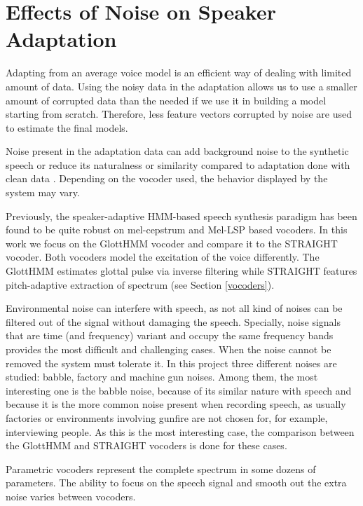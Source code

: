 \section{Effects of Noise on Speaker Adaptation}
\label{noise_speaker_adaptation}
Adapting from an average voice model is an efficient way of dealing with limited amount of data.
%
Using the noisy data in the adaptation allows us to use a smaller amount of corrupted data than the needed if we use it in building a model starting from scratch.
%
Therefore, less feature vectors corrupted by noise are used to estimate the final models.

Noise present in the adaptation data can add background noise to the synthetic speech or reduce its naturalness or similarity compared to adaptation done with clean data \cite{karhila_jstsp_14}.
%
Depending on the vocoder used, the behavior displayed by the system may vary.

Previously, the speaker-adaptive HMM-based speech synthesis paradigm has been found to be quite robust on mel-cepstrum \cite{karhila_jstsp_14, yamagishi2008robustness} and Mel-LSP \cite{Yanagisawa_SSW8} based vocoders.
%
In this work we focus on the GlottHMM vocoder and compare it to the STRAIGHT vocoder.
%
Both vocoders model the excitation of the voice differently.
%
The GlottHMM estimates glottal pulse via inverse filtering while STRAIGHT features pitch-adaptive extraction of spectrum (see Section \ref{vocoders}).

Environmental noise can interfere with speech, as not all kind of noises can be filtered out of the signal without damaging the speech.
%
Specially, noise signals that are time (and frequency) variant and occupy the same frequency bands provides the most difficult and challenging cases.
%
When the noise cannot be removed the system must tolerate it.
%
In this project three different noises are studied: babble, factory and machine gun noises.
%
Among them, the most interesting one is the babble noise, because of its similar nature with speech and because it is the more common noise present when recording speech, as usually factories or environments involving gunfire are not chosen for, for example, interviewing people.
%
As this is the most interesting case, the comparison between the GlottHMM and STRAIGHT vocoders is done for these cases.

Parametric vocoders represent the complete spectrum in some dozens of parameters.
%
The ability to focus on the speech signal and smooth out the extra noise varies between vocoders.

